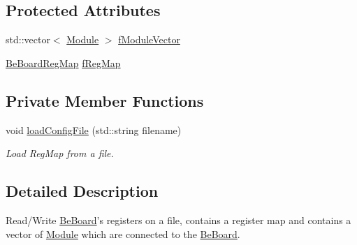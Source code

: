 \subsection*{Protected Attributes}
\begin{DoxyCompactItemize}
\item 
std\-::vector$<$ \hyperlink{class_ph2___hw_description_1_1_module}{Module} $>$ \hyperlink{class_ph2___hw_description_1_1_be_board_adcee78870a20c92fc8c060ff709a4baf}{f\-Module\-Vector}
\item 
\hyperlink{namespace_ph2___hw_description_a2e13fb82c8ed98154c60f9d0f8467d72}{Be\-Board\-Reg\-Map} \hyperlink{class_ph2___hw_description_1_1_be_board_a6db4850485715c0f23c97c3d621a781b}{f\-Reg\-Map}
\end{DoxyCompactItemize}
\subsection*{Private Member Functions}
\begin{DoxyCompactItemize}
\item 
void \hyperlink{class_ph2___hw_description_1_1_be_board_a1aaade58f564544b17de9509ad82cb0e}{load\-Config\-File} (std\-::string filename)
\begin{DoxyCompactList}\small\item\em Load Reg\-Map from a file. \end{DoxyCompactList}\end{DoxyCompactItemize}


\subsection{Detailed Description}
Read/\-Write \hyperlink{class_ph2___hw_description_1_1_be_board}{Be\-Board}'s registers on a file, contains a register map and contains a vector of \hyperlink{class_ph2___hw_description_1_1_module}{Module} which are connected to the \hyperlink{class_ph2___hw_description_1_1_be_board}{Be\-Board}. 

